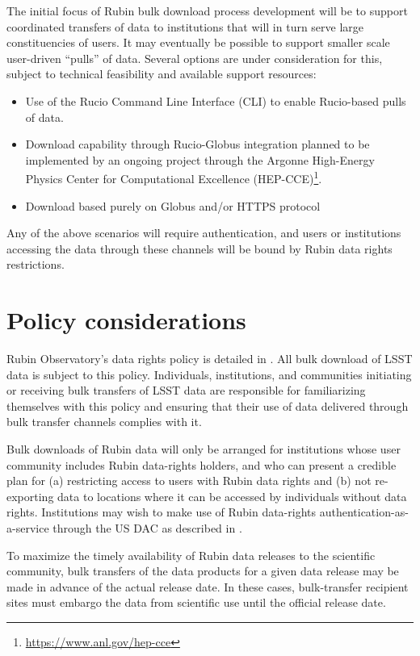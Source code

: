 The initial focus of Rubin bulk download process development will be to support coordinated transfers of data to institutions that will in turn serve large constituencies of users. It may eventually be possible to support smaller scale user-driven ``pulls'' of data. Several options are under consideration for this, subject to technical feasibility and available support resources:
\begin{itemize}
\item Use of the Rucio Command Line Interface (CLI) to enable Rucio-based pulls of data.
\item Download capability through Rucio-Globus integration planned to be implemented by an ongoing project through the Argonne High-Energy Physics Center for Computational Excellence (HEP-CCE)\footnote{\url{https://www.anl.gov/hep-cce}}.
\item Download based purely on Globus and/or HTTPS protocol
\end{itemize}
Any of the above scenarios will require authentication, and users or institutions accessing the data through these channels will be bound by Rubin data rights restrictions.

\section{Policy considerations}

Rubin Observatory's data rights policy is detailed in . All bulk download of LSST data is subject to this policy. Individuals, institutions, and communities initiating or receiving bulk transfers of LSST data are responsible for familiarizing themselves with this policy and ensuring that their use of data delivered through bulk transfer channels complies with it.

Bulk downloads of Rubin data will only be arranged for institutions whose user community includes Rubin data-rights holders, and who can present a credible plan for (a) restricting access to users with Rubin data rights and (b) not re-exporting data to locations where it can be accessed by individuals without data rights. Institutions may wish to make use of Rubin data-rights authentication-as-a-service through the US DAC as described in .

To maximize the timely availability of Rubin data releases to the scientific community, bulk transfers of the data products for a given data release may be made in advance of the actual release date. In these cases, bulk-transfer recipient sites must embargo the data from scientific use until the official release date.


